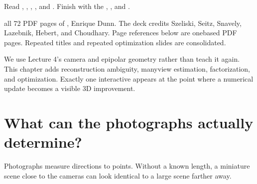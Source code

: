 \documentclass[letterpaper,11pt,english,openany,oneside]{jupyterBook}
\begin{document}
\sphinxAtStartPar
Read {\hyperref[\detokenize{lectures/lecture06/ambiguity::doc}]{}}, {\hyperref[\detokenize{lectures/lecture06/factorization::doc}]{}}, {\hyperref[\detokenize{lectures/lecture06/triangulation::doc}]{}}, {\hyperref[\detokenize{lectures/lecture06/pipeline::doc}]{}}, and {\hyperref[\detokenize{lectures/lecture06/optimization::doc}]{}}. Finish with the {\hyperref[\detokenize{lectures/lecture06/quiz-workbook::doc}]{}}, {\hyperref[\detokenize{lectures/lecture06/review::doc}]{}}, and {\hyperref[\detokenize{lectures/lecture06/tldr::doc}]{}}.

\sphinxAtStartPar
{} all 72 PDF pages of , Enrique Dunn. The deck credits Szeliski, Seitz, Snavely, Lazebnik, Hebert, and Choudhary. Page references below are one\sphinxhyphen{}based PDF pages. Repeated titles and repeated optimization slides are consolidated.

\sphinxAtStartPar
We use Lecture 4’s camera and epipolar geometry rather than teach it again. This chapter adds reconstruction ambiguity, many\sphinxhyphen{}view estimation, factorization, and optimization. Exactly one interactive appears at the point where a numerical update becomes a visible 3D improvement.

\sphinxstepscope


\section{What can the photographs actually determine?}
\label{\detokenize{lectures/lecture06/ambiguity:what-can-the-photographs-actually-determine}}\label{\detokenize{lectures/lecture06/ambiguity:lec06-ambiguity}}\label{\detokenize{lectures/lecture06/ambiguity::doc}}
\sphinxAtStartPar
{} Photographs measure directions to points. Without a known length, a miniature scene close to the cameras can look identical to a large scene farther away.
\end{document}
